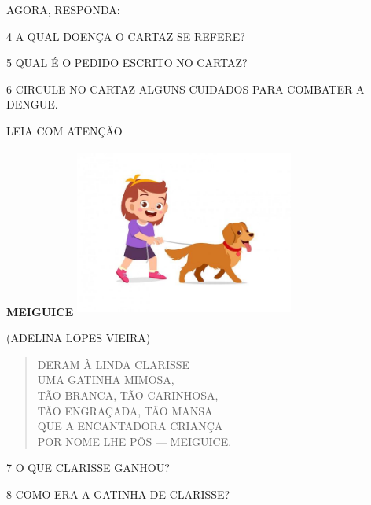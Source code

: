 AGORA, RESPONDA:

\num{4} A QUAL DOENÇA O CARTAZ SE REFERE?


\num{5} QUAL É O PEDIDO ESCRITO NO CARTAZ?


\num{6} CIRCULE NO CARTAZ ALGUNS CUIDADOS PARA COMBATER A DENGUE.


LEIA COM ATENÇÃO

\textbf{MEIGUICE}
\includegraphics[width=2.83472in,height=2.19792in]{media/image128.jpg}

(ADELINA LOPES VIEIRA)

\begin{verse}
DERAM À LINDA CLARISSE\\
UMA GATINHA MIMOSA,\\
TÃO BRANCA, TÃO CARINHOSA,\\
TÃO ENGRAÇADA, TÃO MANSA\\
QUE A ENCANTADORA CRIANÇA\\
POR NOME LHE PÔS --- MEIGUICE.
\end{verse}



\num{7} O QUE CLARISSE GANHOU?


\num{8} COMO ERA A GATINHA DE CLARISSE?


